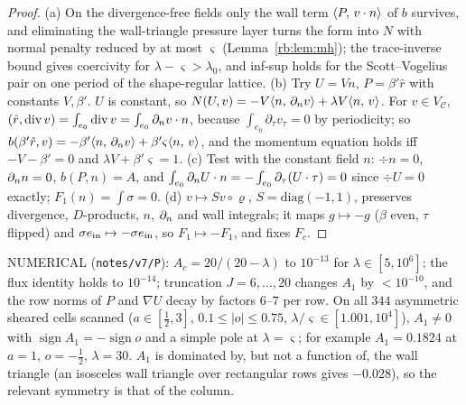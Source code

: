 \begin{proof}
(a) On the divergence-free fields only the wall term $\langle P,\, v\cdot n\rangle$ of $b$ survives, and eliminating the wall-triangle pressure layer turns the form into $N$ with normal penalty reduced by at most $\varsigma$ (Lemma~\ref{rb:lem:mh}); the trace-inverse bound gives coercivity for $\lambda-\varsigma>\lambda_0$, and inf-sup holds for the Scott--Vogelius pair on one period of the shape-regular lattice. (b) Try $U=Vn$, $P=\beta'\hat r$ with constants $V,\beta'$. $U$ is constant, so $N(U,v)=-V\langle n,\, \partial_n v\rangle+\lambda V\langle n,\, v\rangle$. For $v\in V_{\mathcal C}$, $(\hat r,\operatorname{div} v)=\int_{e_0}\operatorname{div} v=\int_{e_0}\partial_n v\cdot n$, because $\int_{e_0}\partial_\tau v_\tau=0$ by periodicity; so $b(\beta'\hat r,v)=-\beta'\langle n,\, \partial_n v\rangle+\beta'\varsigma\langle n,\, v\rangle$, and the momentum equation holds iff $-V-\beta'=0$ and $\lambda V+\beta'\varsigma=1$. (c) Test with the constant field $n$: $\div n=0$, $\partial_n n=0$, $b(P,n)=A$, and $\int_{e_0}\partial_n U\cdot n=-\int_{e_0}\partial_\tau(U\cdot\tau)=0$ since $\div U=0$ exactly; $F_1(n)=\int\sigma=0$. (d) $v\mapsto Sv\circ\varrho$, $S=\mathrm{diag}(-1,1)$, preserves divergence, $D$-products, $n$, $\partial_n$ and wall integrals; it maps $g\mapsto-g$ ($\beta$ even, $\tau$ flipped) and $\sigma e_{\rm in}\mapsto-\sigma e_{\rm in}$, so $F_1\mapsto-F_1$, and fixes $F_c$.
\end{proof}

NUMERICAL (\texttt{notes/v7/P}): $A_c=20/(20-\lambda)$ to $10^{-13}$ for $\lambda\in[5,10^6]$; the flux identity holds to $10^{-14}$; truncation $J=6,\dots,20$ changes $A_1$ by $<10^{-10}$, and the row norms of $P$ and $\nabla U$ decay by factors $6$--$7$ per row. On all $344$ asymmetric sheared cells scanned ($a\in[\frac12,3]$, $0.1\le|o|\le0.75$, $\lambda/\varsigma\in[1.001,10^4]$), $A_1\ne0$ with $\operatorname{sign}A_1=-\operatorname{sign}o$ and a simple pole at $\lambda=\varsigma$; for example $A_1=0.1824$ at $a=1$, $o=-\frac12$, $\lambda=30$. $A_1$ is dominated by, but not a function of, the wall triangle (an isosceles wall triangle over rectangular rows gives $-0.028$), so the relevant symmetry is that of the column.

